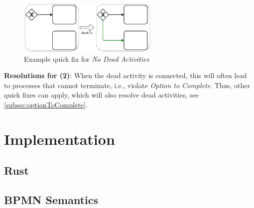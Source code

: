 \documentclass[runningheads]{llncs}
\begin{document}
\begin{figure}[ht]
	\centering
	\includegraphics[width=0.6\textwidth]{images/dead}
	\caption{Example quick fix for \textit{No Dead Activities}}
	\label{fig:noDeadActivitiesQuickFix}
\end{figure}

\textbf{Resolutions for (2)}: When the dead activity is connected, this will often lead to processes that cannot terminate, i.e., violate \textit{Option to Complete}.
Thus, other quick fixes can apply, which will also resolve dead activities, see \autoref{subsec:optionToComplete}.

\section{Implementation}


\subsection{Rust}



\subsection{BPMN Semantics}
\end{document}
